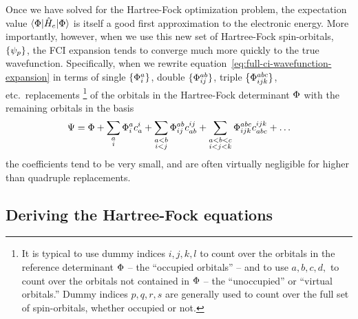 \documentclass[11pt]{article}
\numberwithin{equation}{section}
\begin{document}
Once we have solved for the Hartree-Fock optimization problem, the expectation value $\langle\Phi |\hat{H}_e|\Phi \rangle$ is itself a good first approximation to the electronic energy.
More importantly, however, when we use this new set of Hartree-Fock spin-orbitals, $\{\psi _p\}$, the FCI expansion tends to converge much more quickly to the true wavefunction.
Specifically, when we rewrite equation~\ref{eq:full-ci-wavefunction-expansion} in terms of single $\{\Phi _i^a\}$, double $\{\Phi _{ij}^{ab}\}$, triple $\{\Phi _{ijk}^{abc}\}$, etc.\ replacements \footnote{It is typical to use dummy indices $i,j,k,l$ to count over the orbitals in the reference determinant $\Phi $ -- the ``occupied orbitals'' -- and to use $a,b,c,d,$ to count over the orbitals not contained in $\Phi $ -- the ``unoccupied'' or ``virtual orbitals.''  Dummy indices $p,q,r,s$ are generally used to count over the full set of spin-orbitals, whether occupied or not.} of the orbitals in the Hartree-Fock determinant $\Phi $ with the remaining orbitals in the basis
\begin{align}
	\Psi 
=
	\Phi 
+
	\sum_{\substack{a\\i}}
	\Phi _i^ac_a^i
+
	\sum_{\substack{a<b\\i<j}}
	\Phi _{ij}^{ab}c_{ab}^{ij}
+
	\sum_{\substack{a<b<c\\i<j<k}}
	\Phi _{ijk}^{abc}c_{abc}^{ijk}
+\ldots
\end{align}
the coefficients tend to be very small, and are often virtually negligible for higher than quadruple replacements.

\subsection{Deriving the Hartree-Fock equations}
\end{document}
